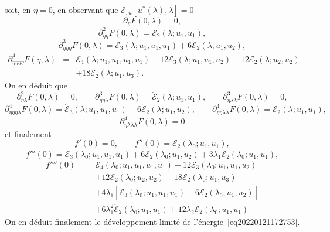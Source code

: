 \documentclass[12pt, final]{amsart}
\begin{document}
soit, en $\eta = 0$, en observant que $\mathcal{E}_{, u} [u^{\ast} (\lambda),
\lambda] = 0$
\begin{equation}
  \partial_{\eta} F (0, \lambda) = 0,
\end{equation}
\begin{equation}
  \partial_{\eta  \eta}^2 F (0, \lambda) =\mathcal{E}_2 (\lambda ;
  u_1, u_1),
\end{equation}
\begin{equation}
  \partial_{\eta  \eta  \eta}^3 F (0, \lambda) =\mathcal{E}_3
  (\lambda ; u_1, u_1, u_1) + 6\mathcal{E}_2 (\lambda ; u_1, u_2),
\end{equation}
\begin{eqnarray}
  \partial_{\eta  \eta  \eta  \eta}^4 F (\eta,
  \lambda) & = & \mathcal{E}_4 (\lambda ; u_1, u_1, u_1, u_1) +
  12\mathcal{E}_3 (\lambda ; u_1, u_1, u_2) + 12\mathcal{E}_2 (\lambda ; u_2,
  u_2) \nonumber\\
  &  & + 18\mathcal{E}_2 (\lambda ; u_1, u_3) .
\end{eqnarray}
On en déduit que
\begin{equation}
  \partial_{\eta  \lambda}^2 F (0, \lambda) = 0, \qquad \partial_{\eta
   \eta  \lambda}^3 F (0, \lambda) = \dot{\mathcal{E}}_2
  (\lambda ; u_1, u_1), \qquad \partial_{\eta  \lambda
  \lambda}^3 F (0, \lambda) = 0,
\end{equation}
\begin{equation}
  \partial_{\eta  \eta  \eta  \lambda}^4 F (0,
  \lambda) = \dot{\mathcal{E}}_3 (\lambda ; u_1, u_1, u_1) + 6
  \dot{\mathcal{E}}_2 (\lambda ; u_1, u_2), \qquad \partial_{\eta
  \eta  \lambda  \lambda}^4 F (0, \lambda) =
  \ddot{\mathcal{E}}_2 (\lambda ; u_1, u_1),
\end{equation}
\begin{equation}
  \partial_{\eta  \lambda  \lambda  \lambda}^4 F (0,
  \lambda) = 0
\end{equation}
et finalement
\begin{equation}
  f' (0) = 0, \qquad f'' (0) =\mathcal{E}_2 (\lambda_0 ; u_1, u_1),
\end{equation}
\begin{equation}
  f''' (0) =\mathcal{E}_3 (\lambda_0 ; u_1, u_1, u_1) + 6\mathcal{E}_2
  (\lambda_0 ; u_1, u_2) + 3 \lambda_1  \dot{\mathcal{E}}_2 (\lambda_0 ; u_1,
  u_1),
\end{equation}
\begin{eqnarray}
  f'''' (0) & = & \mathcal{E}_4 (\lambda_0 ; u_1, u_1, u_1, u_1) +
  12\mathcal{E}_3 (\lambda_0 ; u_1, u_1, u_2) \nonumber\\
  &  & + 12\mathcal{E}_2 (\lambda_0 ; u_2, u_2) + 18\mathcal{E}_2 (\lambda_0
  ; u_1, u_3) \nonumber\\
  &  & + 4 \lambda_1  [\dot{\mathcal{E}}_3 (\lambda_0 ; u_1, u_1, u_1) + 6
  \dot{\mathcal{E}}_2 (\lambda_0 ; u_1, u_2)] \nonumber\\
  &  & + 6 \lambda_1^2  \ddot{\mathcal{E}}_2 (\lambda_0 ; u_1, u_1) + 12
  \lambda_2  \dot{\mathcal{E}}_2 (\lambda_0 ; u_1, u_1)
\end{eqnarray}
On en déduit finalement le développement limité de
l'énergie~\eqref{eq20220121172753}.
\end{document}
